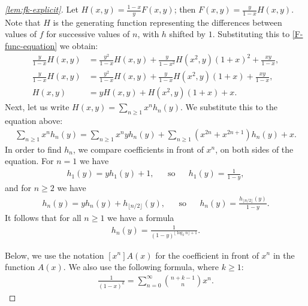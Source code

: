 \documentclass[envcountsect,envcountsame]{llncs}
\newcommand{\fk}{f}
\newcommand{\Fk}{F}
\begin{document}
\begin{proof}[\cref{lem:fk-explicit}]
		Let $H(x, y) = \frac{1 - x}{y} \Fk(x, y)$; then $\Fk(x, y) = \frac{y}{1 - x} H(x, y)$.
		Note that $H$ is the generating function representing the differences between values of $\fk$ for successive values of $n$, with $h$ shifted by $1$.
		Substituting this to \cref{F-func-equation} we obtain:
		\begin{align*}
			\frac{y}{1 - x} H(x, y) &= \frac{y^2}{1 - x} H(x, y) + \frac{y}{1 - x^2} H(x^2, y) (1 + x)^2 + \frac{x y}{1 - x},\\
			\frac{y}{1 - x} H(x, y) &= \frac{y^2}{1 - x} H(x, y) + \frac{y}{1 - x} H(x^2, y) (1 + x) + \frac{x y}{1 - x},\\
			H(x, y) &= y H(x, y) + H(x^2, y) (1 + x) + x.
		\end{align*}
		Next, let us write $H(x, y) = \sum_{n \geq 1} x^n h_n(y)$.
		We substitute this to the equation above:
		\begin{align*}
			\sum_{n \geq 1} x^n h_n(y) = \sum_{n \geq 1} x^n y h_n(y) + \sum_{n \geq 1} (x^{2 n} + x^{2 n + 1}) h_n(y) + x.
		\end{align*}
		In order to find $h_n$, we compare coefficients in front of $x^n$, on both sides of the equation.
		For $n = 1$ we have
		\begin{align*}
			h_1(y) = y h_1(y) + 1,&&\mbox{so}&&h_1(y) = \frac{1}{1 - y},
		\end{align*}
		and for $n \geq 2$ we have
		\begin{align*}
			h_n(y) = y h_n(y) + h_{\lfloor n / 2 \rfloor}(y),&&\mbox{so}&&h_n(y) = \frac{h_{\lfloor n / 2 \rfloor}(y)}{1 - y}.
		\end{align*}
		It follows that for all $n\geq 1$ we have a formula
		\begin{align*}
			h_n(y) = \frac{1}{(1 - y)^{\lfloor \log_2 n \rfloor + 1}}.
		\end{align*}

		Below, we use the notation $[x^n]A(x)$ for the coefficient in front of $x^n$ in the function $A(x)$.
		We also use the following formula, where $k\geq 1$:
		\begin{align}\label{eq:geom-power}
			\frac{1}{(1 - x)^k} = \sum_{n = 0}^\infty \binom{n + k - 1}{n} x^n.
		\end{align}


\end{proof}
\end{document}

